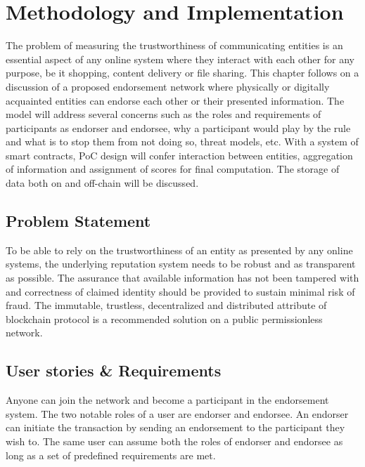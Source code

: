 \chapter{Methodology and Implementation} \label{ch:method}
The problem of measuring the trustworthiness of communicating entities is an
essential aspect of any online system where they interact with each other for
any purpose, be it shopping, content delivery or file sharing. This chapter
follows on a discussion of a proposed endorsement network where physically or
digitally acquainted entities can endorse each other or their presented
information. The model will address several concerns such as the roles and
requirements of participants as endorser and endorsee, why a participant would
play by the rule and what is to stop them from not doing so, threat models,
etc. With a system of smart contracts, PoC design will confer interaction
between entities, aggregation of information and assignment of scores for final
computation. The storage of data both on and off-chain will be discussed.  

\section{Problem Statement}
To be able to rely on the trustworthiness of an entity as presented by any
online systems, the underlying reputation system needs to be robust and as
transparent as possible. The assurance that available information has not been
tampered with and correctness of claimed identity should be provided to sustain
minimal risk of fraud. The immutable, trustless, decentralized and distributed
attribute of blockchain protocol is a recommended solution on a public
permissionless network.

\section{ User stories \& Requirements} \label{ch:UserStories}
Anyone can join the network and become a participant in the endorsement system.
The two notable roles of a user are endorser and endorsee. An endorser can
initiate the transaction by sending an endorsement to the participant they wish
to. The same user can assume both the roles of endorser and endorsee as long as
a set of predefined requirements are met.  \\ 


